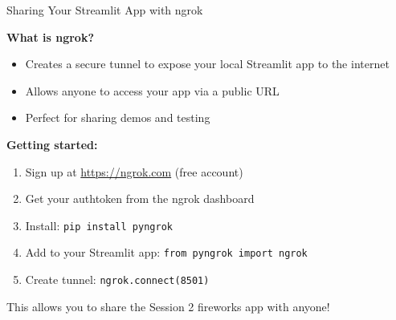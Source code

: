 \documentclass[aspectratio=169]{beamer}
\begin{document}
\begin{frame}{Sharing Your Streamlit App with ngrok}

\textbf{What is ngrok?}
\begin{itemize}
    \item Creates a secure tunnel to expose your local Streamlit app to the internet
    \item Allows anyone to access your app via a public URL
    \item Perfect for sharing demos and testing
\end{itemize}

\vspace{1em}

\textbf{Getting started:}
\begin{enumerate}
    \item Sign up at \url{https://ngrok.com} (free account)
    \item Get your authtoken from the ngrok dashboard
    \item Install: \texttt{pip install pyngrok}
    \item Add to your Streamlit app: \texttt{from pyngrok import ngrok}
    \item Create tunnel: \texttt{ngrok.connect(8501)}
\end{enumerate}

\vspace{0.5em}

\small
This allows you to share the Session 2 fireworks app with anyone!

\end{frame}
\end{document}
